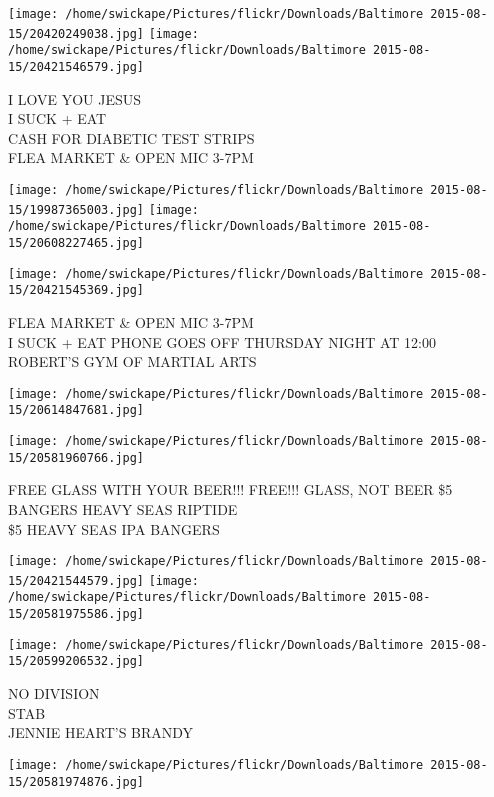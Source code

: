 \documentclass[10pt,letterpaper]{article}
\begin{document}
\texttt{[image: /home/swickape/Pictures/flickr/Downloads/Baltimore 2015-08-15/20420249038.jpg]}
\texttt{[image: /home/swickape/Pictures/flickr/Downloads/Baltimore 2015-08-15/20421546579.jpg]}

I LOVE YOU JESUS\\
I SUCK + EAT\\
CASH FOR DIABETIC TEST STRIPS\\
FLEA MARKET \& OPEN MIC 3{-}7PM
\pagebreak

\texttt{[image: /home/swickape/Pictures/flickr/Downloads/Baltimore 2015-08-15/19987365003.jpg]}
\texttt{[image: /home/swickape/Pictures/flickr/Downloads/Baltimore 2015-08-15/20608227465.jpg]}

\vspace{0.25in}
\texttt{[image: /home/swickape/Pictures/flickr/Downloads/Baltimore 2015-08-15/20421545369.jpg]}

FLEA MARKET \& OPEN MIC 3{-}7PM\\
I SUCK + EAT PHONE GOES OFF THURSDAY NIGHT AT 12:00\\
ROBERT'S GYM OF MARTIAL ARTS
\pagebreak

\texttt{[image: /home/swickape/Pictures/flickr/Downloads/Baltimore 2015-08-15/20614847681.jpg]}

\vspace{0.25in}
\texttt{[image: /home/swickape/Pictures/flickr/Downloads/Baltimore 2015-08-15/20581960766.jpg]}

FREE GLASS WITH YOUR BEER!!! FREE!!! GLASS, NOT BEER \$5 BANGERS HEAVY SEAS RIPTIDE\\
\$5 HEAVY SEAS IPA BANGERS
\pagebreak

\texttt{[image: /home/swickape/Pictures/flickr/Downloads/Baltimore 2015-08-15/20421544579.jpg]}
\texttt{[image: /home/swickape/Pictures/flickr/Downloads/Baltimore 2015-08-15/20581975586.jpg]}

\vspace{0.25in}
\texttt{[image: /home/swickape/Pictures/flickr/Downloads/Baltimore 2015-08-15/20599206532.jpg]}

NO DIVISION\\
STAB\\
JENNIE HEART'S BRANDY
\pagebreak

\texttt{[image: /home/swickape/Pictures/flickr/Downloads/Baltimore 2015-08-15/20581974876.jpg]}
\end{document}
